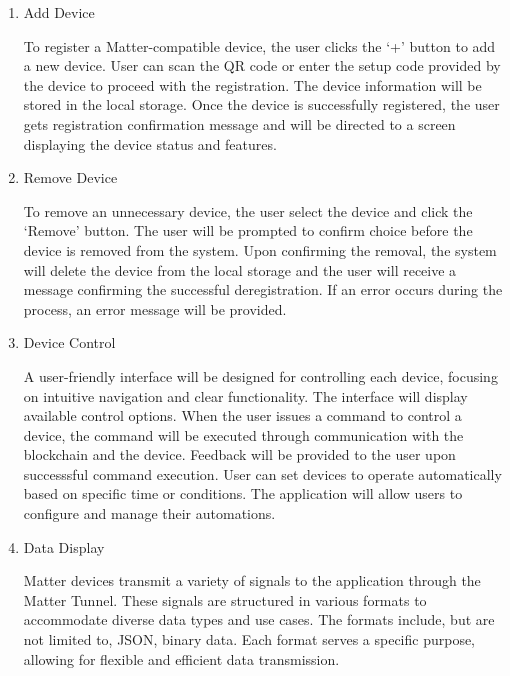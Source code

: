 \documentclass[conference]{IEEEtran}
\begin{document}
\begin{enumerate}[itemsep=2ex, parsep=1ex]
	\item Add Device
	      	      	      
	      To register a Matter-compatible device, the user clicks the ‘+’ button to add
	      a new device. User can scan the QR code or enter the setup code provided
	      by the device to proceed with the registration. The device information will
	      be stored in the local storage. Once the device is successfully registered,
	      the user gets registration confirmation message and will be directed to a screen
	      displaying the device status and features.
	      	      	      
	\item Remove Device
	      	      	      
	      To remove an unnecessary device, the user select the device and click the ‘Remove’
	      button. The user will be prompted to confirm choice before the device is
	      removed from the system. Upon confirming the removal, the system will
	      delete the device from the local storage and the user will receive a
	      message confirming the successful deregistration. If an error occurs during
	      the process, an error message will be provided.
	      	      	      
	\item Device Control
	      	      	      
	      A user-friendly interface will be designed for controlling each device, focusing
	      on intuitive navigation and clear functionality. The interface will
	      display available control options. When the user issues a command to control
	      a device, the command will be executed through communication with the
	      blockchain and the device. Feedback will be provided to the user upon successsful
	      command execution. User can set devices to operate automatically based on
	      specific time or conditions. The application will allow users to configure
	      and manage their automations.
	      	      	      
	\item Data Display
	      	      	      
	      Matter devices transmit a variety of signals to the application through
	      the Matter Tunnel. These signals are structured in various formats to accommodate
	      diverse data types and use cases. The formats include, but are not limited
	      to, JSON, binary data. Each format serves a specific purpose, allowing for
	      flexible and efficient data transmission.
	      	      	      

\end{enumerate}
\end{document}
